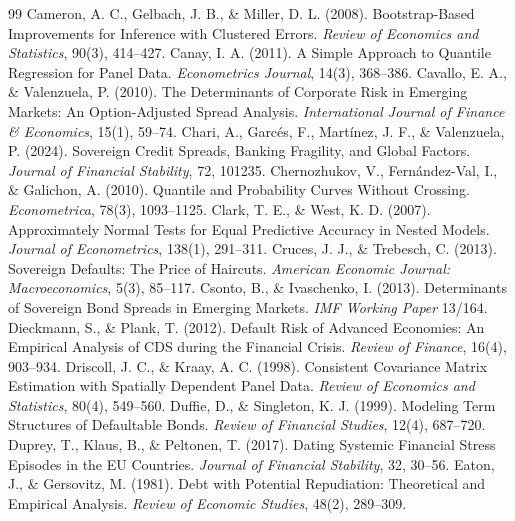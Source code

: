 \begin{thebibliography}{99}
 Cameron, A. C., Gelbach, J. B., \& Miller, D. L. (2008). Bootstrap-Based Improvements for Inference with Clustered Errors. \textit{Review of Economics and Statistics}, 90(3), 414--427.
 Canay, I. A. (2011). A Simple Approach to Quantile Regression for Panel Data. \textit{Econometrics Journal}, 14(3), 368--386.
 Cavallo, E. A., \& Valenzuela, P. (2010). The Determinants of Corporate Risk in Emerging Markets: An Option-Adjusted Spread Analysis. \textit{International Journal of Finance \& Economics}, 15(1), 59--74.
 Chari, A., Garcés, F., Martínez, J. F., \& Valenzuela, P. (2024). Sovereign Credit Spreads, Banking Fragility, and Global Factors. \textit{Journal of Financial Stability}, 72, 101235.
 Chernozhukov, V., Fernández-Val, I., \& Galichon, A. (2010). Quantile and Probability Curves Without Crossing. \textit{Econometrica}, 78(3), 1093--1125.
 Clark, T. E., \& West, K. D. (2007). Approximately Normal Tests for Equal Predictive Accuracy in Nested Models. \textit{Journal of Econometrics}, 138(1), 291--311.
 Cruces, J. J., \& Trebesch, C. (2013). Sovereign Defaults: The Price of Haircuts. \textit{American Economic Journal: Macroeconomics}, 5(3), 85--117.
 Csonto, B., \& Ivaschenko, I. (2013). Determinants of Sovereign Bond Spreads in Emerging Markets. \textit{IMF Working Paper} 13/164.
 Dieckmann, S., \& Plank, T. (2012). Default Risk of Advanced Economies: An Empirical Analysis of CDS during the Financial Crisis. \textit{Review of Finance}, 16(4), 903--934.
 Driscoll, J. C., \& Kraay, A. C. (1998). Consistent Covariance Matrix Estimation with Spatially Dependent Panel Data. \textit{Review of Economics and Statistics}, 80(4), 549--560.
 Duffie, D., \& Singleton, K. J. (1999). Modeling Term Structures of Defaultable Bonds. \textit{Review of Financial Studies}, 12(4), 687--720.
 Duprey, T., Klaus, B., \& Peltonen, T. (2017). Dating Systemic Financial Stress Episodes in the EU Countries. \textit{Journal of Financial Stability}, 32, 30--56.
 Eaton, J., \& Gersovitz, M. (1981). Debt with Potential Repudiation: Theoretical and Empirical Analysis. \textit{Review of Economic Studies}, 48(2), 289--309.

\end{thebibliography}
